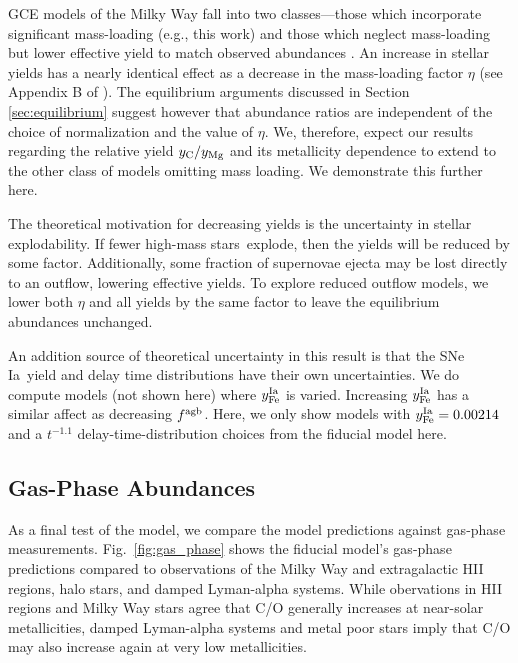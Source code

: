 \documentclass[fleqn,usenatbib]{mnras}
\newcommand{\gce}{GCE}
\newcommand{\ia}{SNe Ia}
\newcommand{\hms}{high-mass stars}
\begin{document}
\gce{} models of the Milky Way fall into two classes---those which incorporate significant mass-loading (e.g., this work) and those which neglect mass-loading but lower effective yield to match observed abundances \citep[e.g.][]{MCM13, MCM14, spitoni19, spitoni20, spitoni21}.
An increase in stellar yields has a nearly identical effect as a decrease in the mass-loading factor $\eta$ (see Appendix B of \citealt{james_dwarf}).
The equilibrium arguments discussed in Section \ref{sec:equilibrium} suggest however that abundance ratios are independent of the choice of normalization and the value of $\eta$. We, therefore, expect our results regarding the relative yield $y_{\rm C}/y_{\rm Mg}$ and its metallicity dependence to extend to the other class of models omitting mass loading. We demonstrate this further here.

The theoretical motivation for decreasing yields is the uncertainty in stellar explodability.
If fewer \hms\ explode, then the yields will be reduced by some factor. Additionally, some fraction of supernovae ejecta may be lost directly to an outflow, lowering effective yields. To explore reduced outflow models, we lower both $\eta$ and all yields by the same factor to leave the equilibrium abundances unchanged. 


An addition source of theoretical uncertainty in this result is that the \ia\ yield and delay time distributions have their own uncertainties. We do compute models (not shown here) where $y_{\rm Fe}^{\rm Ia}$ is varied. Increasing $y_{\rm Fe}^{\rm Ia}$ has a similar affect as decreasing $f^{\rm agb}$. Here, we only show models with $y_{\rm Fe}^{\rm Ia} = 0.00214$ and a $t^{-1.1}$ delay-time-distribution choices from the fiducial model here.



\subsection{Gas-Phase Abundances}\label{sec:gas}

As a final test of the model, we compare the model predictions against gas-phase measurements. Fig.~\ref{fig:gas_phase} shows the fiducial model's gas-phase predictions compared to observations of the Milky Way and extragalactic HII regions, halo stars, and damped Lyman-alpha systems. 
While obervations in HII regions and Milky Way stars agree that C/O generally increases at near-solar metallicities, damped Lyman-alpha systems and metal poor stars imply that C/O may also increase again at very low metallicities. 
\end{document}
